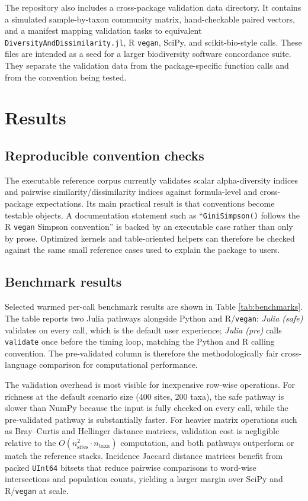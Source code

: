 \documentclass[preprint,12pt,authoryear]{elsarticle}
\begin{document}
The repository also includes a cross-package validation data directory.  It
contains a simulated sample-by-taxon community matrix, hand-checkable paired
vectors, and a manifest mapping validation tasks to equivalent
\texttt{DiversityAndDissimilarity.jl}, R \texttt{vegan}, SciPy, and scikit-bio-style
calls.  These files are intended as a seed for a larger biodiversity software
concordance suite.  They separate the validation data from the package-specific
function calls and from the convention being tested.

\section{Results}

\subsection{Reproducible convention checks}

The executable reference corpus currently validates scalar alpha-diversity
indices and pairwise similarity/dissimilarity indices against formula-level
and cross-package expectations.  Its main practical result is that
conventions become testable objects.  A documentation statement such as
``\texttt{GiniSimpson()} follows the R \texttt{vegan} Simpson convention'' is
backed by an executable case rather than only by prose.  Optimized kernels
and table-oriented helpers can therefore be checked against the same small
reference cases used to explain the package to users.

\subsection{Benchmark results}

Selected warmed per-call benchmark results are shown in Table
\ref{tab:benchmarks}.  The table reports two Julia pathways alongside Python
and R/\texttt{vegan}: \emph{Julia (safe)} validates on every call, which is
the default user experience; \emph{Julia (pre)} calls \texttt{validate} once
before the timing loop, matching the Python and R calling convention.  The
pre-validated column is therefore the methodologically fair cross-language
comparison for computational performance.

The validation overhead is most visible for inexpensive row-wise operations.
For richness at the default scenario size (400 sites, 200 taxa), the safe
pathway is slower than NumPy because the input is fully checked on every call,
while the pre-validated pathway is substantially faster.  For heavier matrix
operations such as Bray--Curtis and Hellinger distance matrices, validation
cost is negligible relative to the $O(n_{\text{sites}}^2 \cdot n_{\text{taxa}})$
computation, and both pathways outperform or match the reference stacks.
Incidence Jaccard distance matrices benefit from packed \texttt{UInt64} bitsets
that reduce pairwise comparisons to word-wise intersections and population
counts, yielding a larger margin over SciPy and R/\texttt{vegan} at scale.
\end{document}
